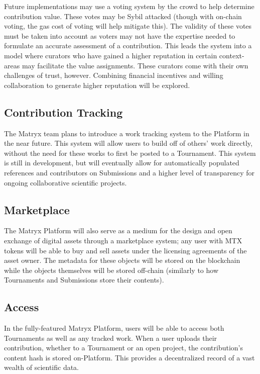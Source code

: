 \documentclass[a4paper, 10pt, conference]{ieeeconf}      %
\begin{document}
Future implementations may use a voting system by the crowd to help determine contribution value.
These votes may be Sybil attacked (though with on-chain voting, the gas cost of voting will help mitigate this). 
The validity of these votes must be taken into account as voters may not have the expertise needed to formulate an accurate assessment of a contribution. 
This leads the system into a model where curators who have gained a higher reputation in certain context-areas may facilitate the value assignments. 
These curators come with their own challenges of trust, however. 
Combining financial incentives and willing collaboration to generate higher reputation will be explored.

\subsection{Contribution Tracking} \label{contributiontracking}
The Matryx team plans to introduce a work tracking system to the Platform in the near future. This system will allow users to build off of others' work directly, without the need for these works to first be posted to a Tournament. This system is still in development, but will eventually allow for automatically populated references and contributors on Submissions and a higher level of transparency for ongoing collaborative scientific projects.

\subsection{Marketplace}\label{marketplace}
The Matryx Platform will also serve as a medium for the design and open exchange of digital assets through a marketplace system; any user with MTX tokens will be able to buy and sell assets under the licensing agreements of the asset owner. 
The metadata for these objects will be stored on the blockchain while the objects themselves will be stored off-chain (similarly to how Tournaments and Submissions store their contents).
\subsection{Access} \label{access}
In the fully-featured Matryx Platform, users will be able to access both Tournaments as well as any tracked work. 
When a user uploads their contribution, whether to a Tournament or an open project, the contribution's content hash is stored on-Platform.
This provides a decentralized record of a vast wealth of scientific data.
\end{document}
